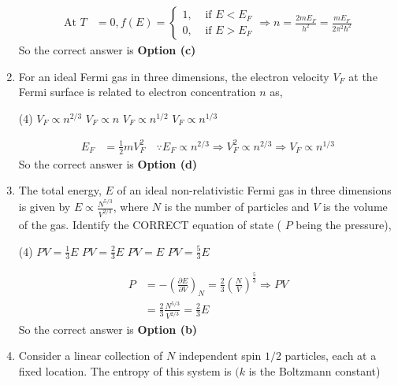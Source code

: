 \begin{enumerate}
\begin{answer}
\begin{align*}
		\text{At }T&=0, f(E)=\left\{\begin{array}{ll}1, & \text { if } E<E_{F} \\ 0, & \text { if } E>E_{F}\end{array} \Rightarrow n=\frac{2 m E_{F}}{h^{2}}=\frac{m E_{F}}{2 \pi^{2} \hbar^{2}}\right.
		\end{align*}
		So the correct answer is \textbf{Option (c)}
	\end{answer}
	\item For an ideal Fermi gas in three dimensions, the electron velocity $V_{F}$ at the Fermi surface is related to electron concentration $n$ as,
	{}
	\begin{tasks}(4)
		\task[\textbf{a.}] $V_{F} \propto n^{2 / 3}$
		\task[\textbf{b.}]  $V_{F} \propto n$
		\task[\textbf{c.}] $V_{F} \propto n^{1 / 2}$
		\task[\textbf{d.}] $V_{F} \propto n^{1 / 3}$
	\end{tasks}
	\begin{answer}
		\begin{align*}
		E_{F}&=\frac{1}{2} m V_{F}^{2} \quad \because E_{F} \propto n^{2 / 3} \Rightarrow V_{F}^{2} \propto n^{2 / 3} \Rightarrow V_{F} \propto n^{1 / 3}
		\end{align*}
		So the correct answer is \textbf{Option (d)}
	\end{answer}
	\item The total energy, $E$ of an ideal non-relativistic Fermi gas in three dimensions is given by $E \propto \frac{N^{5 / 3}}{V^{2 / 3}}$, where $N$ is the number of particles and $V$ is the volume of the gas. Identify the CORRECT equation of state ( $P$ being the pressure),
	{}
	\begin{tasks}(4)
		\task[\textbf{a.}] $P V=\frac{1}{3} E$
		\task[\textbf{b.}] $P V=\frac{2}{3} E$
		\task[\textbf{c.}] $P V=E$
		\task[\textbf{d.}] $P V=\frac{5}{3} E$
	\end{tasks}
	\begin{answer}
		\begin{align*}
		P&=-\left(\frac{\partial E}{\partial V}\right)_{N}=\frac{2}{3}\left(\frac{N}{V}\right)^{\frac{5}{3}} \Rightarrow P V\\&=\frac{2}{3} \frac{N^{5 / 3}}{V^{2 / 3}}=\frac{2}{3} E
		\end{align*}
		So the correct answer is \textbf{Option (b)}
	\end{answer}
	\item Consider a linear collection of $N$ independent spin $1 / 2$ particles, each at a fixed location. The entropy of this system is $(k$ is the Boltzmann constant)

\end{enumerate}
